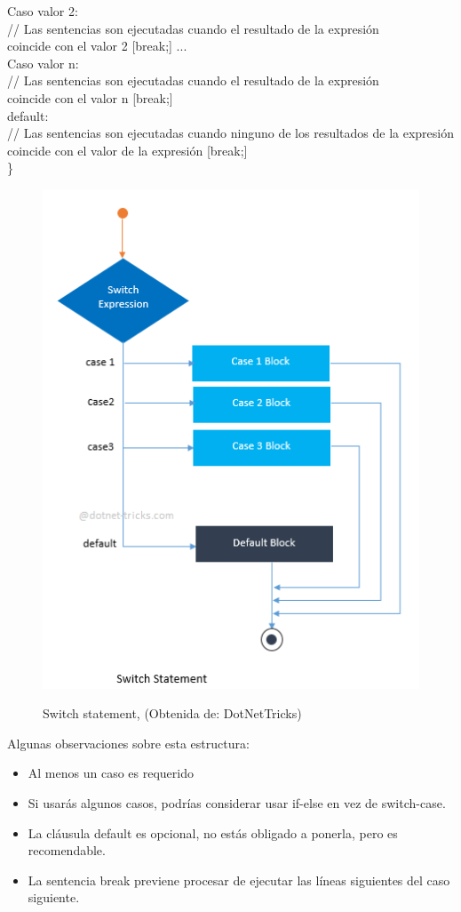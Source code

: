 \documentclass[11pt, letterpaper, spanish]{article}
\begin{document}
{{   Caso valor 2: \\
     // Las sentencias son ejecutadas cuando el resultado de la expresión \\ coincide con el valor 2 \vspace{0.5 cm}
     [break;] 
   ... \\
   Caso valor n:\\
     // Las sentencias son ejecutadas cuando el resultado de la expresión \\ coincide con el valor n \vspace{0.5 cm}
     [break;] \\
   default: \\
     // Las sentencias son ejecutadas cuando ninguno de los resultados de la expresión  \\ coincide con el valor de la expresión \vspace{0.5 cm}
     [break;] \\
\} \\
 \begin{figure}
	    \centering
\caption{Switch statement, (Obtenida de: {DotNetTricks})}
		\includegraphics[width=0.5 \textwidth]{switch.png}
		\label{Imagen_Switch}
	\end{figure}
\par{Algunas observaciones sobre esta estructura:
\begin{itemize}
\item Al menos un caso es requerido
\item Si usarás algunos casos, podrías considerar usar if-else en vez de switch-case.
\item La cláusula default es opcional, no estás obligado a ponerla, pero es recomendable.
\item La sentencia break previene procesar de ejecutar las líneas siguientes del caso siguiente.

\end{itemize}}}}
\end{document}
